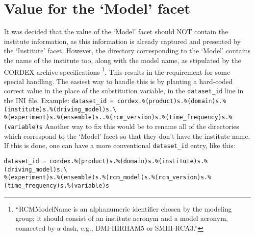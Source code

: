 \section{Value for the `Model' facet}
It was decided that the value of the `Model' facet should NOT contain the institute information, as this information is already captured and presented by the `Institute' facet.  However, the directory corresponding to the `Model' contains the name of the institute too, along with the model name, as stipulated by the CORDEX archive specifications \footnote{``RCMModelName is an alphanumeric identifier chosen by the modeling group; it should consist of an institute acronym and a model acronym, connected by a dash, e.g., DMI-HIRHAM5 or SMHI-RCA3.''\cite{cordexarchivespecs}}. This results in the requirement for some special handling.
\mypar
The easiest way to handle this is by planting a hard-coded correct value in the place of the substitution variable, in the \texttt{dataset\_id} line in the INI file. Example:
\mypar
\texttt{dataset\_id = cordex.\%(product)s.\%(domain)s.\%(institute)s.\%(driving\_model)s.\textbackslash\\
\%(experiment)s.\%(ensemble)s..\%(rcm\_version)s.\%(time\_frequency)s.\%(variable)s}
\mypar
{}
\mypar
Another way to fix this would be to rename all of the directories which correspond to the `Model' facet so that they don't have the institute name. If this is done, one can have a more conventional \texttt{dataset\_id} entry, like this:
\mypar
\begin{small}
\texttt{dataset\_id = cordex.\%(product)s.\%(domain)s.\%(institute)s.\%(driving\_model)s.\textbackslash\\
\%(experiment)s.\%(ensemble)s.\%(rcm\_model)s.\%(rcm\_version)s.\%(time\_frequency)s.\%(variable)s}
\end{small}
